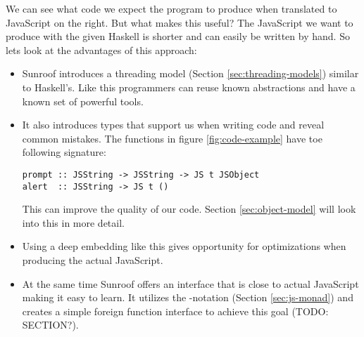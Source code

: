 We can see what code we expect the program to produce when 
translated to JavaScript on the right. But what makes 
this useful? The JavaScript we want to produce with the given
Haskell is shorter and can easily be written by hand.
So lets look at the advantages of this approach:
\begin{itemize}

\item
Sunroof introduces a threading model (Section \ref{sec:threading-models}) similar
to Haskell's. Like this programmers can reuse known abstractions
and have a known set of powerful tools.

\item 
It also introduces types that support us when 
writing code and reveal common mistakes. The functions
in figure \ref{fig:code-example} have toe following signature:
\begin{verbatim}
prompt :: JSString -> JSString -> JS t JSObject
alert  :: JSString -> JS t ()
\end{verbatim}
This can improve the quality of our code.
Section \ref{sec:object-model} will look into this in more detail.

\item 
Using a deep embedding like this gives opportunity 
for optimizations when producing the actual JavaScript.

\item
At the same time Sunroof offers an interface that is 
close to actual JavaScript making it easy to learn.
It utilizes the -notation (Section \ref{sec:js-monad}) and creates a 
simple foreign function interface to achieve this goal (TODO: SECTION?).
\end{itemize}

